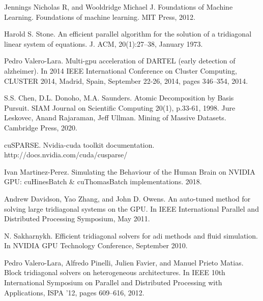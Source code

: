 \begin{thebibliography}{1}
  Jennings Nicholas R, and Wooldridge Michael J. Foundations of Machine Learning. Foundations of machine learning. MIT Press, 2012.

  Harold S. Stone. An efficient parallel algorithm for the solution of a tridiagonal linear system of
  equations. J. ACM, 20(1):27–38, January 1973.
  
  Pedro Valero-Lara. Multi-gpu acceleration of DARTEL (early detection of alzheimer). In 2014
  IEEE International Conference on Cluster Computing, CLUSTER 2014, Madrid, Spain, September
  22-26, 2014, pages 346–354, 2014.
  
  S.S. Chen, D.L. Donoho, M.A. Saunders. Atomic Decomposition by Basis Pursuit. SIAM Journal on Scientific Computing 20(1), p.33-61, 1998.
  Jure Leskovec, Anand Rajaraman, Jeff Ullman. Mining of Massive Datasets. Cambridge Press, 2020.

  cuSPARSE. Nvidia-cuda toolkit documentation.
  http://docs.nvidia.com/cuda/cusparse/

  Ivan Martinez-Perez. Simulating the Behaviour of the Human Brain on NVIDIA GPU:
cuHinesBatch & cuThomasBatch implementations. 2018.

  Andrew Davidson, Yao Zhang, and John D. Owens. An auto-tuned method for
solving large tridiagonal systems on the GPU. In IEEE International Parallel and
Distributed Processing Symposium, May 2011.

  N. Sakharnykh. Efficient tridiagonal solvers for adi methods and fluid simulation.
  In NVIDIA GPU Technology Conference, September 2010.

  Pedro Valero-Lara, Alfredo Pinelli, Julien Favier, and Manuel Prieto Matias. Block
tridiagonal solvers on heterogeneous architectures. In IEEE 10th International
Symposium on Parallel and Distributed Processing with Applications, ISPA ’12,
pages 609–616, 2012.
  \end{thebibliography}